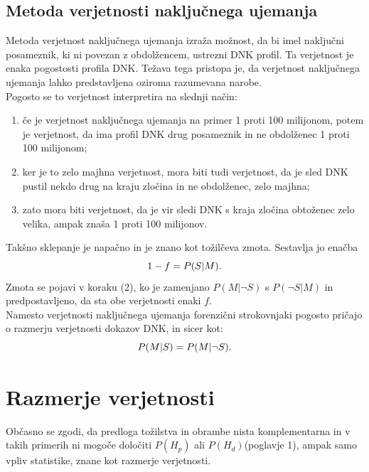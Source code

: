 \documentclass[12pt,a4paper]{amsart}
\theoremstyle{definition} %
\theoremstyle{plain} %
\begin{document}
\subsection{Metoda verjetnosti naključnega ujemanja}
Metoda verjetnost naključnega ujemanja izraža možnost, da bi imel naključni posameznik, ki ni povezan z obdolžencem,
ustrezni DNK profil. Ta verjetnost je enaka pogostosti profila DNK. Težava tega pristopa je, da verjetnost naključnega ujemanja lahko predstavljena
oziroma razumevana narobe. \\
Pogosto se to verjetnost interpretira na slednji način:
\begin{enumerate}
   \item če je verjetnost naključnega ujemanja na primer 1 proti 100 milijonom, potem je verjetnost, da ima profil DNK drug posameznik in ne
   obdolženec 1 proti 100 milijonom;
   \item ker je to zelo majhna verjetnost, mora biti tudi verjetnost, da je sled DNK pustil nekdo drug na kraju zločina in ne obdolženec, zelo majhna;
   \item zato mora biti verjetnost, da je vir sledi DNK s kraja zločina obtoženec zelo velika, ampak znaša 1 proti 100 milijonov.
\end{enumerate}
Takšno sklepanje je napačno in je znano kot tožilčeva zmota. Sestavlja jo enačba
\begin{equation}\label{eq:tozilcevazmota}
   1 - f = P(S \lvert M). \vspace{2mm}
\end{equation}
Zmota se pojavi v koraku (2), ko je zamenjano $P(M \lvert \neg S)$ s $P(\neg S \lvert M)$ in predpostavljeno, da sta obe verjetnosti enaki $f$. \\
Namesto verjetnosti naključnega ujemanja forenzični strokovnjaki pogosto pričajo o razmerju verjetnosti dokazov DNK, in
sicer kot:
\[
   P(M \lvert S) = P(M \lvert \neg S). \vspace{2mm}
\]

\section{Razmerje verjetnosti}
Občasno se zgodi, da predloga tožilstva in obrambe nista komplementarna in v takih primerih ni mogoče določiti $P(H_p)$ ali $P(H_d)$(poglavje 1), 
ampak samo vpliv statistike, znane kot razmerje verjetnosti.
\end{document}
